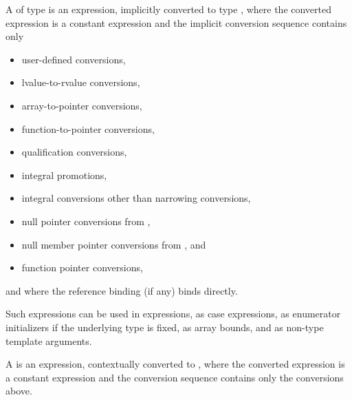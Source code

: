 \pnum
A 
of type  is an
expression, implicitly converted to type , where
the converted expression is a constant expression and the
implicit conversion sequence contains only
\begin{itemize}
\item user-defined conversions,
\item lvalue-to-rvalue conversions,
\item array-to-pointer conversions,
\item function-to-pointer conversions,
\item qualification conversions,
\item integral promotions,
\item integral conversions other than narrowing conversions,
\item null pointer conversions from ,
\item null member pointer conversions from , and
\item function pointer conversions,
\end{itemize}
and where the reference binding (if any) binds directly.
\begin{note}
Such expressions can be used in 
expressions, as case expressions,
as enumerator initializers if the underlying type is
fixed, as array bounds, and
as non-type template
arguments.
\end{note}
%
%
A  is
an expression, contextually converted to ,
where the converted expression is a constant expression and
the conversion sequence contains only the conversions above.

